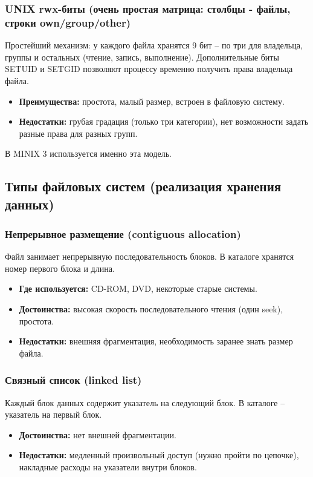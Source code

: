 \documentclass[a4paper,12pt]{article}
\begin{document}
\subsubsection{UNIX rwx-биты (очень простая матрица: столбцы - файлы, строки own/group/other)}
Простейший механизм: у каждого файла хранятся 9 бит – по три для владельца, группы и остальных (чтение, запись, выполнение). Дополнительные биты SETUID и SETGID позволяют процессу временно получить права владельца файла.
\begin{itemize}
    \item \textbf{Преимущества:} простота, малый размер, встроен в файловую систему.
    \item \textbf{Недостатки:} грубая градация (только три категории), нет возможности задать разные права для разных групп.
\end{itemize}
В MINIX 3 используется именно эта модель.

\subsection{Типы файловых систем (реализация хранения данных)}
\subsubsection{Непрерывное размещение (contiguous allocation)}
Файл занимает непрерывную последовательность блоков. В каталоге хранятся номер первого блока и длина.
\begin{itemize}
    \item \textbf{Где используется:} CD-ROM, DVD, некоторые старые системы.
    \item \textbf{Достоинства:} высокая скорость последовательного чтения (один seek), простота.
    \item \textbf{Недостатки:} внешняя фрагментация, необходимость заранее знать размер файла.
\end{itemize}

\subsubsection{Связный список (linked list)}
Каждый блок данных содержит указатель на следующий блок. В каталоге – указатель на первый блок.
\begin{itemize}
    \item \textbf{Достоинства:} нет внешней фрагментации.
    \item \textbf{Недостатки:} медленный произвольный доступ (нужно пройти по цепочке), накладные расходы на указатели внутри блоков.
\end{itemize}
\end{document}
